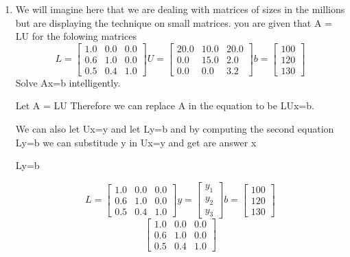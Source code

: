 \documentclass{article}
\begin{document}
\begin{enumerate}
  \item We will imagine here that we are dealing with matrices of sizes in the millions but are displaying the technique on small matrices. you are given that A = LU for the folowing matrices
    \[
      L = 
      \begin{bmatrix}
        1.0 & 0.0 & 0.0 \\
        0.6 & 1.0 & 0.0 \\
        0.5 & 0.4 & 1.0 
      \end{bmatrix}
      U = 
      \begin{bmatrix}
        20.0 & 10.0 & 20.0 \\
        0.0 & 15.0 & 2.0 \\
        0.0 & 0.0 & 3.2 
      \end{bmatrix}
      b = 
      \begin{bmatrix}
        100 \\
        120 \\
        130 
      \end{bmatrix}
    \]
    Solve Ax=b intelligently.
    \par
    Let A = LU Therefore we can replace A in the equation to be LUx=b.
    \par
    We can also let Ux=y and let Ly=b and by computing the second equation Ly=b we can substitude y in Ux=y and get are answer x
    \begin{center}
      Ly=b
    \end{center}
    \[
      L = 
      \begin{bmatrix}
        1.0 & 0.0 & 0.0 \\
        0.6 & 1.0 & 0.0 \\
        0.5 & 0.4 & 1.0 
      \end{bmatrix}
      y = 
      \begin{bmatrix}
        y_1 \\
        y_2 \\
        y_3
      \end{bmatrix}
      b = 
      \begin{bmatrix}
        100 \\
        120 \\
        130 
      \end{bmatrix}
    \]
    \[
      \begin{bmatrix}
        1.0 & 0.0 & 0.0 \\
        0.6 & 1.0 & 0.0 \\
        0.5 & 0.4 & 1.0 
      \end{bmatrix}
\]
\end{enumerate}
\end{document}
